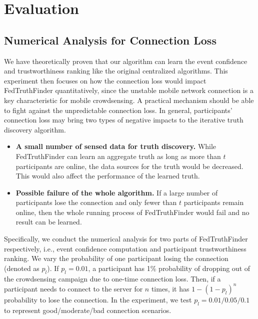 


\section{Evaluation}

\subsection{Numerical Analysis for Connection Loss}
\label{sec:numeric_analysis}

We have theoretically proven that our algorithm can learn the event confidence and trustworthiness ranking like the original centralized algorithms. This experiment then focuses on how the connection loss would impact FedTruthFinder quantitatively, since the unstable mobile network connection is a key characteristic for mobile crowdsensing. A practical mechanism should be able to fight against the unpredictable connection loss.
In general, participants' connection loss may bring two types of negative impacts to the iterative truth discovery algorithm.


\begin{itemize}
	\item \textbf{A small number of sensed data for truth discovery.} While FedTruthFinder can learn an aggregate truth as long as more than $t$ participants are online, the data sources for the truth would be decreased. This would also affect the performance of the learned truth.
	\item \textbf{Possible failure of the whole algorithm.} If a large number of participants lose the connection and only fewer than $t$ participants remain online, then the whole running process of FedTruthFinder would fail and no result can be learned.
\end{itemize}

Specifically, we conduct the numerical analysis for two parts of FedTruthFinder respectively, i.e., event confidence computation and participant trustworthiness ranking. We vary the probability of one participant losing the connection (denoted as $p_l$). If $p_l=0.01$, a participant has 1\% probability of dropping out of the crowdsensing campaign due to one-time connection loss. Then, if a participant needs to connect to the server for $n$ times, it has $1-(1-p_l)^n$ probability to lose the connection. In the experiment, we test $p_l=0.01/0.05/0.1$ to represent good/moderate/bad connection scenarios.





